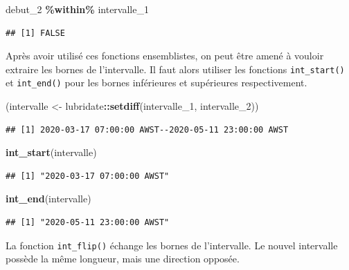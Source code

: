\documentclass[
  11pt,
]{book}
\newenvironment{Shaded}{\begin{snugshade}}{\end{snugshade}}
\newcommand{\DecValTok}[1]{\textcolor[rgb]{0.00,0.00,0.81}{#1}}
\newcommand{\KeywordTok}[1]{\textcolor[rgb]{0.13,0.29,0.53}{\textbf{#1}}}
\newcommand{\NormalTok}[1]{#1}
\newcommand{\OperatorTok}[1]{\textcolor[rgb]{0.81,0.36,0.00}{\textbf{#1}}}
\newcommand{\StringTok}[1]{\textcolor[rgb]{0.31,0.60,0.02}{#1}}
\numberwithin{equation}{section}
\numberwithin{countremarque}{section}
\begin{document}
\begin{Shaded}
\begin{Highlighting}[]
\NormalTok{debut\_}\DecValTok{2} \OperatorTok{\%within\%}\StringTok{ }\NormalTok{intervalle\_}\DecValTok{1}
\end{Highlighting}
\end{Shaded}

\begin{lstlisting}
## [1] FALSE
\end{lstlisting}

Après avoir utilisé ces fonctions ensemblistes, on peut être amené à vouloir extraire les bornes de l'intervalle. Il faut alors utiliser les fonctions \texttt{int\_start()} et \texttt{int\_end()} pour les bornes inférieures et supérieures respectivement.

\begin{Shaded}
\begin{Highlighting}[]
\NormalTok{(intervalle \textless{}{-}}\StringTok{ }\NormalTok{lubridate}\OperatorTok{::}\KeywordTok{setdiff}\NormalTok{(intervalle\_}\DecValTok{1}\NormalTok{, intervalle\_}\DecValTok{2}\NormalTok{))}
\end{Highlighting}
\end{Shaded}

\begin{lstlisting}
## [1] 2020-03-17 07:00:00 AWST--2020-05-11 23:00:00 AWST
\end{lstlisting}

\begin{Shaded}
\begin{Highlighting}[]
\KeywordTok{int\_start}\NormalTok{(intervalle)}
\end{Highlighting}
\end{Shaded}

\begin{lstlisting}
## [1] "2020-03-17 07:00:00 AWST"
\end{lstlisting}

\begin{Shaded}
\begin{Highlighting}[]
\KeywordTok{int\_end}\NormalTok{(intervalle)}
\end{Highlighting}
\end{Shaded}

\begin{lstlisting}
## [1] "2020-05-11 23:00:00 AWST"
\end{lstlisting}

La fonction \texttt{int\_flip()} échange les bornes de l'intervalle. Le nouvel intervalle possède la même longueur, mais une direction opposée.
\end{document}
